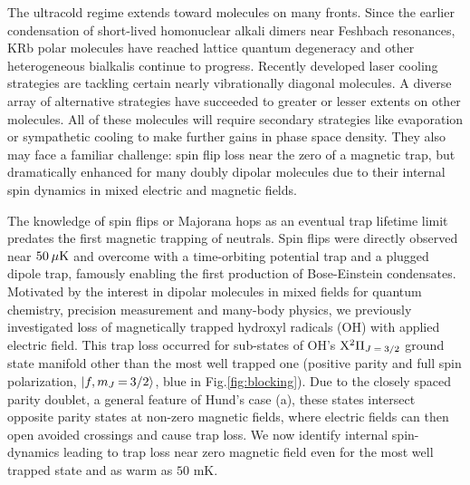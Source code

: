 \documentclass[%
 reprint,
 amsmath,amssymb,
 aps,
prl,
]{revtex4-1}
\newcommand{\s}{{\nobreak\hspace{.2em}}}
\begin{document}
The ultracold regime extends toward molecules on many fronts\s\cite{Carr2009}. 
Since the earlier condensation of short-lived homonuclear alkali dimers near Feshbach resonances\s\cite{Greiner2003,Zwierlein2003,Jochim2003}, KRb polar molecules have reached lattice quantum degeneracy\s\cite{Moses2015} and other heterogeneous bialkalis continue to progress\s\cite{Takekoshi2014, Park2015,Guo2016,Liu2017,Rvachov2017}. 
Recently developed laser cooling strategies are tackling certain nearly vibrationally diagonal molecules\s\cite{Stuhl2008,Hummon2013, Barry2014, Zhelyazkova2014, Hemmerling2016,Truppe2017}. 
A diverse array of alternative strategies have succeeded to greater or lesser extents on other molecules\s\cite{Doyle1998, Bethlem1999, Bochinski2003, Narevicius2008, Wiederkehr2012, Prehn2016,Liu2017a}. 
All of these molecules will require secondary strategies like evaporation or sympathetic cooling to make further gains in phase space density\s\cite{Parazzoli2011, Stuhl2012evap, Quemener2016}. 
They also may face a familiar challenge: spin flip loss near the zero of a magnetic trap, but dramatically enhanced for many doubly dipolar molecules due to their internal spin dynamics in mixed electric and magnetic fields. 

The knowledge of spin flips or Majorana hops as an eventual trap lifetime limit predates the first magnetic trapping of neutrals\s\cite{Migdall1985}. 
Spin flips were directly observed near $50\s\mu\text{K}$ and overcome with a time-orbiting potential trap\s\cite{Petrich1995} and a plugged dipole trap\s\cite{Davis1995}, famously enabling the first production of Bose-Einstein condensates.
Motivated by the interest in dipolar molecules in mixed fields for quantum chemistry, precision measurement and many-body physics, we previously investigated loss of magnetically trapped hydroxyl radicals (OH) with applied electric field\s\cite{Stuhl2012uwave}. 
This trap loss occurred for sub-states of OH's $\mathrm{X}^2\Pi_{J\s {=}\s 3/2}$ ground state manifold other than the most well trapped one (positive parity and full spin polarization, $|f,m_J\s {=}\s 3/2\rangle$, blue in Fig.\s\ref{fig:blocking}). 
Due to the closely spaced parity doublet, a general feature of Hund's case (a), these states intersect opposite parity states at non-zero magnetic fields, where electric fields can then open avoided crossings and cause trap loss.
We now identify internal spin-dynamics leading to trap loss near zero magnetic field even for the most well trapped state and as warm as $50\text{ mK}$.
\end{document}
